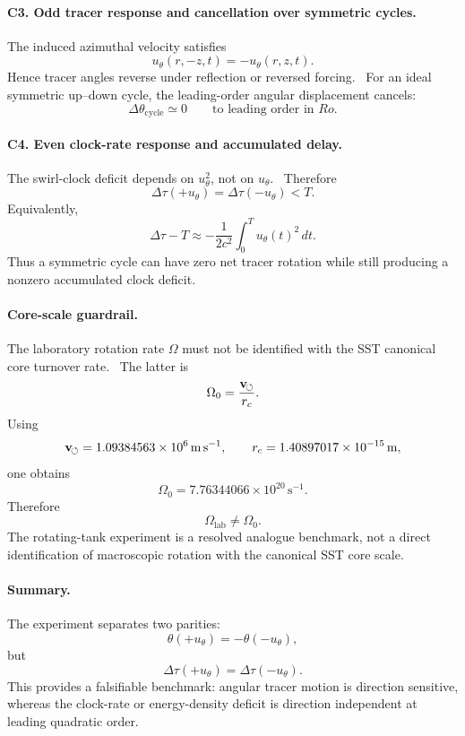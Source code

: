 \paragraph{C3. Odd tracer response and cancellation over symmetric cycles.}
The induced azimuthal velocity satisfies
\[
u_\theta(r,-z,t)=-u_\theta(r,z,t).
\]
Hence tracer angles reverse under reflection or reversed forcing.  For an
ideal symmetric up--down cycle, the leading-order angular displacement cancels:
\[
\boxed{
\Delta\theta_{\mathrm{cycle}}
\simeq
0
\qquad
\text{to leading order in } Ro .
}
\]

\paragraph{C4. Even clock-rate response and accumulated delay.}
The swirl-clock deficit depends on \(u_\theta^2\), not on \(u_\theta\).  Therefore
\[
\boxed{
\Delta\tau(+u_\theta)=\Delta\tau(-u_\theta)<T.
}
\]
Equivalently,
\[
\boxed{
\Delta\tau-T
\approx
-\frac{1}{2c^2}
\int_0^T u_\theta(t)^2\,dt .
}
\]
Thus a symmetric cycle can have zero net tracer rotation while still producing
a nonzero accumulated clock deficit.

\paragraph{Core-scale guardrail.}
The laboratory rotation rate \(\Omega\) must not be identified with the SST
canonical core turnover rate.  The latter is
\[
\Omega_0
=
\frac{\mathbf{v}_{\!\boldsymbol{\circlearrowleft}}}{r_c}.
\]
Using
\[
\mathbf{v}_{\!\boldsymbol{\circlearrowleft}}=1.09384563\times10^6\,\mathrm{m\,s^{-1}},
\qquad
r_c=1.40897017\times10^{-15}\,\mathrm m,
\]
one obtains
\[
\boxed{
\Omega_0
=
7.76344066\times10^{20}\,\mathrm{s^{-1}}.
}
\]
Therefore
\[
\boxed{
\Omega_{\mathrm{lab}}\neq\Omega_0.
}
\]
The rotating-tank experiment is a resolved analogue benchmark, not a direct
identification of macroscopic rotation with the canonical SST core scale.

\paragraph{Summary.}
The experiment separates two parities:
\[
\boxed{
\theta(+u_\theta)=-\theta(-u_\theta),
}
\]
but
\[
\boxed{
\Delta\tau(+u_\theta)=\Delta\tau(-u_\theta).
}
\]
This provides a falsifiable benchmark: angular tracer motion is direction
sensitive, whereas the clock-rate or energy-density deficit is direction
independent at leading quadratic order.

